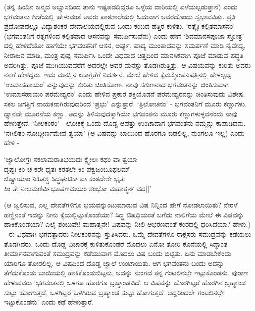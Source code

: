 (ತನ್ನ ಹಿಂದಿನ ಜನ್ಮದ ಅಭ್ಯಾಸದಿಂದ ತಾನು ಇಷ್ಟಪಡದಿದ್ದರೂ ಒಳ್ಳೆಯ ದಾರಿಯಲ್ಲಿ ಎಳೆಯಲ್ಪಡುತ್ತಾನೆ) ಎಂದು ಭಗವಂತನು ಗೀತೆಯಲ್ಲಿ ಹೇಳುವಂತೆ ಅವರು ಪಾಠಶಾಲೆಯಲ್ಲಿ ಓದುವಾಗ ಅವರದೊಂದು ಸ್ವಭಾವವಿತ್ತು. ಪ್ರತಿ ಪ್ರದೋಷದಲ್ಲೂ ವಿದ್ಯಾಶಂಕರ ದೇವಾಲಯದಲ್ಲಿರುವ ಒಂದು ಕಂಬದ ಹತ್ತಿರ ಕುಳಿತು. `ರತ್ನೈಃ ಕಲ್ಪಿತಮಾಸನಂ' (ಭಗವಂತನಿಗೆ ರತ್ನಗಳಿಂದ ಕಲ್ಪಿತವಾದ ಆಸನವನ್ನು ಸಮರ್ಪಿಸುವೆನು) ಎಂದು ಹೇಗೆ `ಶಿವಮಾನಸಪೂಜಾ ಸ್ತೋತ್ರ' ದಲ್ಲಿ ಹೇಳಿದೆಯೋ ಹಾಗೆಯೇ ಭಗವಂತನಿಗೆ ಆಸನ, ಅರ್ಘ್ಯ, ಪಾದ್ಯ ಮುಂತಾದವನ್ನು ಸಮರ್ಪಣೆ ಮಾಡಿ ನೈವೇದ್ಯ, ನೀರಾಜನ ಮಾಡಿ, ಮಂತ್ರ ಪುಷ್ಪ ಸಮರ್ಪಿಸಿ ಒಂದೇ ವಿಧವಾದ ಚಿತ್ತದಿಂದ ಮಾನಸಿಕವಾಗಿ ಪೂಜೆ ಮಾಡುವ ಪದ್ಧತಿ ಅವರಿಗಿತ್ತು. ಪೂಜೆ ಮುಗಿಯುವವರೆಗೆ ಅದರಲ್ಲೇ ಅವರ ಮನಸ್ಸು ತೊಡಗಿರುತ್ತಿತ್ತು. ಆ ವಿಷಯವನ್ನು ಕುರಿತು ಅವರು ನನಗೆ ಹೇಳಿದ್ದರು. ಇದು ಮನಸ್ಸಿನ ಏಕಾಗ್ರತೆಗೆ ನಿದರ್ಶನ. ಮೇಲೆ ಹೇಳಿದ ಕೈವಲ್ಯೋಪನಿಷತ್ತಿನಲ್ಲಿ ಹೇಳಲ್ಪಟ್ಟ `ಉಮಾಸಹಾಯಂ' ಎನ್ನುವುದನ್ನು ಕುರಿತು ಚಿಂತಿಸೋಣ. ನಾವು ಸಗುಣನಾದ ಭಗವಂತನನ್ನು ಚಿಂತಿಸುವಾಗ `ಉಮಾಸಹಾಯಂ ಪರಮೇಶ್ವರಂ' ಎಂದು ಹೇಳಿದ ಪ್ರಕಾರ ಶಕ್ತಿಯೊಡನೆ ಪರಮೇಶ್ವರನನ್ನು ಚಿಂತಿಸುವುದು ವಿಶೇಷ. ಸಕಲ ಜಗತ್ತಿಗೆ ನಾಯಕನಾಗಿರುವುದರಿಂದ `ಪ್ರಭು' ಎನ್ನುತ್ತಾರೆ. `ತ್ರಿಲೋಚನಂ' - ಭಗವಂತನಿಗೆ ಮೂರು ಕಣ್ಣುಗಳು. ಧ್ಯಾನವೇ ಮೂರನೆಯ ಕಣ್ಣು. ಅದನ್ನು ತಿಳಿಸುವುದಕ್ಕಾಗಿಯೇ ಭಗವಂತನು ಮೂರು ಕಣ್ಣುಗಳುಳ್ಳವನೆಂದು ನಾವು ಹೇಳುತ್ತೇವೆ. `ನೀಲಕಂಠಂ' - ಲೋಕಕ್ಕೆ ಒಂದು ದೊಡ್ಡ ಆಪತ್ತು ಉಂಟಾದಾಗ ಭಗವಂತನು ನಮ್ಮನ್ನು ಕಾಪಾಡಿದನು. `ನಗಿಲಿತಂ ನೋದ್ಗೀರ್ಣಮೇವ ತ್ವಯಾ' (ಆ ವಿಷವನ್ನು ಬಾಯಿಂದ ಹೊರಗೂ ಬಿಡಲಿಲ್ಲ, ನುಂಗಲೂ ಇಲ್ಲ) ಎಂದು ಹೇಳಿ - 

\begin{shloka}
`ಜ್ವಾಲೋಗ್ರಃ ಸಕಲಾಮರಾತಿಭಯದಃ ಕ್ಷ್ವೇಲಃ ಕಥಂ ವಾ ತ್ವಯಾ\\
ದೃಷ್ಟಃ ಕಿಂ ಚ ಕರೇ ಧೃತಃ ಕರತಲೇ ಕಿಂ ಪಕ್ವಜಂಬೂಫಲಮ್|\\
ಜಿಹ್ವಾಯಾಂ ನಿಹಿತಶ್ಚ ಸಿದ್ಧಘುಟಿಕಾ ವಾ ಕಂಠದೇಶೇ ಭೃತಃ\\
ಕಿಂ ತೇ ನೀಲಮಣಿರ್ವಿಭೂಷಣಮಯಂ ಶಂಭೋ ಮಹಾತ್ಮನ್ ವದ||'
\end{shloka}

(ಆ ಜ್ವಲಿಸುವ, ಎಲ್ಲ ದೇವತೆಗಳಿಗೂ ಭಯವನ್ನುಂಟುಮಾಡುವ ವಿಷ ನಿನ್ನಿಂದ ಹೇಗೆ ನೋಡಲಾಯಿತು? ನೇರಳೆ ಹಣ್ಣಿನಂತೆ ಇದನ್ನು ನೀನು ಕೈಯಲ್ಲಿಟ್ಟುಕೊಂಡೆಯಾ? ಸಿದ್ಧ ಔಷಧಿಯಂತೆ ಬಗೆದು ನಾಲಿಗೆಯ ಮೇಲೆ ಈ ವಿಷವನ್ನು ಹಾಕಿಕೊಂಡೆಯಾ? ಎಲೈ ಶಂಬುವೇ! ಮಹಾತ್ಮನೇ! ವಿಷವನ್ನು ನೀಲಿ ಆಭರಣದಂತೆ ಕಂಠದಲ್ಲಿ ಧರಿಸಿದೆಯಾ? ಹೇಳು.) - ಈ ವಿಧವಾಗಿ ಭಗವತ್ಪಾದರು ನೀಲಕಂಠನನ್ನು ಸ್ತುತಿಸಿದರು. ಒಮ್ಮೆ ದೇವತೆಗಳೂ ರಾಕ್ಷಸರು ಸಮುದ್ರವನ್ನು ಕಡೆಯಲು ತೊಡಗಿದರು. ಒಂದು ದೊಡ್ಡ ವಿಚಾರಕ್ಕೆ ಕುಳಿತುಕೊಂಡರೆ ಮೊದಲು ಏನೋ ತೋರಿ ಕೊನೆಯಲ್ಲಿ ಸಿದ್ಧಾಂತ ತೀರ್ಮಾನವಾಗುವಂತೆ ಸಮುದ್ರವನ್ನು ಕಡೆಯುವಾಗ ಮೊದಲು ವಿಷ ಬಂದು ಬಿಟ್ಟಿತು. ಏನು ಮಾಡಬೇಕೆಂದು ಯಾರಿಗೂ ತೋರಲಿಲ್ಲ. ಆ ವಿಷದಿಂದ ದೊಡ್ಡ ಜ್ವಾಲೆ ಉಂಟಾಯಿತು. ಆಗ ಭಗವಂತನು ಬಂದು ಅದನ್ನು ತೆಗೆದುಕೊಂಡು ಬಾಯಿಯಲ್ಲಿ ಹಾಕಿಕೊಂಡುಬಿಟ್ಟನು. ಅದನ್ನು ನುಂಗದೆ ತನ್ನ ಗಂಟಲಿನಲ್ಲೇ ಇಟ್ಟುಕೊಂಡನು. ಪುರಾಣ ಹೇಳುವವರು `ಭಗವಂತನಲ್ಲಿ ಒಳಗೂ ಹೊರಗೂ ಬ್ರಹ್ಮಾಂಡವಿದೆ. ಆ ವಿಷವನ್ನು ಹೊರಗಿಟ್ಟರೆ ಹೊರಗಿನ ಬ್ರಹ್ಮಾಂಡ ಸುಟ್ಟು ಹೋಗುತ್ತದೆ, ಒಳಗಿಟ್ಟರೆ ಒಳಗಿರುವ ಬ್ರಹ್ಮಾಂಡ ಸುಟ್ಟು ಹೋಗುತ್ತದೆ. ಆದ್ದರಿಂದಲೇ ಗಂಟಲಿನಲ್ಲೇ ಇಟ್ಟುಕೊಂಡನು' ಎಂದು ಕಥೆ ಹೇಳುತ್ತಾರೆ.

